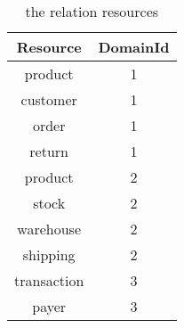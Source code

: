 \begin{table}[h]
    \caption{the relation resources}
    \label{table:table-resources}
    \begin{center}
    \begin{tabular}{|c|c|}
    \hline
    Resource & DomainId\\
    \hline
    product & 1\\
    \hline
    customer & 1\\
    \hline
    order & 1\\
    \hline
    return & 1\\
    \hline
    product & 2\\
    \hline
    stock & 2\\
    \hline
    warehouse & 2\\
    \hline
    shipping & 2\\
    \hline
    transaction & 3\\
    \hline
    payer & 3\\
    \hline
    \end{tabular}
    \end{center}
\end{table}

